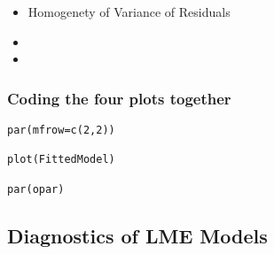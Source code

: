 \documentclass[11pt]{article} %
\begin{document}
\begin{itemize}
\item Homogenety of Variance of Residuals
\item 
\item
\end{itemize}


\subsubsection{Coding the four plots together}

\begin{framed}
\begin{verbatim}
par(mfrow=c(2,2))

plot(FittedModel)

par(opar)
\end{verbatim}
\end{framed}

\newpage
\subsection{Diagnostics of LME Models}






\end{document}
